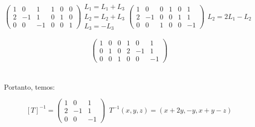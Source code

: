 \begin{enumerate}
	$$\left(
	\begin{array}{ccc|ccc}
		1  & 0  & 1  & 1  & 0  &  0 \\
		2  & -1 & 1  & 0  & 1  &  0 \\
		0  & 0  & -1 & 0  & 0  &  1
	\end{array}
	\right)
	\begin{array}{c}
		L_1 = L_1 + L_3 \\
		L_2 = L_2 + L_3 \\
		L_3 = -L_3	
	\end{array}
	\left(
	\begin{array}{ccc|ccc}
		1  & 0  & 0  & 1  & 0  &  1 \\
		2  & -1 & 0  & 0  & 1  &  1 \\
		0  & 0  & 1  & 0  & 0  & -1
	\end{array}
	\right)
	\begin{array}{c}
		\\
		L_2 = 2L_1 - L_2 \\
	\end{array}
	$$
	
	$$\left(
	\begin{array}{ccc|ccc}
		1  & 0  & 0  & 1  & 0  &  1 \\
		0  & 1  & 0  & 2  & -1 &  1 \\
		0  & 0  & 1  & 0  & 0  & -1
	\end{array}
	\right)
	$$
	\\ \\
	Portanto, temos:
	
	$$
	\left[T\right]^{-1} = 
	\left(
	\begin{array}{ccc}
		1  & 0  &  1 \\
		2  & -1 &  1 \\
		0  & 0  & -1
	\end{array}
	\right)
	\, \, \,
	T^{-1}(x, y, z) = (x + 2y, -y, x + y - z)
	$$
	\end{enumerate}
